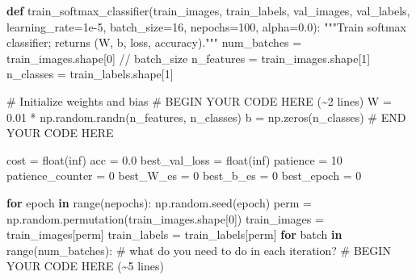 \documentclass[
  letterpaper,
  DIV=11,
  numbers=noendperiod]{scrartcl}
\newenvironment{Shaded}{\begin{snugshade}}{\end{snugshade}}
\newcommand{\BuiltInTok}[1]{\textcolor[rgb]{0.00,0.23,0.31}{#1}}
\newcommand{\CommentTok}[1]{\textcolor[rgb]{0.37,0.37,0.37}{#1}}
\newcommand{\ControlFlowTok}[1]{\textcolor[rgb]{0.00,0.23,0.31}{\textbf{#1}}}
\newcommand{\DecValTok}[1]{\textcolor[rgb]{0.68,0.00,0.00}{#1}}
\newcommand{\FloatTok}[1]{\textcolor[rgb]{0.68,0.00,0.00}{#1}}
\newcommand{\KeywordTok}[1]{\textcolor[rgb]{0.00,0.23,0.31}{\textbf{#1}}}
\newcommand{\NormalTok}[1]{\textcolor[rgb]{0.00,0.23,0.31}{#1}}
\newcommand{\OperatorTok}[1]{\textcolor[rgb]{0.37,0.37,0.37}{#1}}
\newcommand{\RegionMarkerTok}[1]{\textcolor[rgb]{0.00,0.23,0.31}{#1}}
\newcommand{\StringTok}[1]{\textcolor[rgb]{0.13,0.47,0.30}{#1}}
\begin{document}
\begin{Shaded}
\begin{Highlighting}[]
\KeywordTok{def}\NormalTok{ train\_softmax\_classifier(train\_images, train\_labels, val\_images, val\_labels,}
\NormalTok{                             learning\_rate}\OperatorTok{=}\FloatTok{1e{-}5}\NormalTok{, batch\_size}\OperatorTok{=}\DecValTok{16}\NormalTok{, nepochs}\OperatorTok{=}\DecValTok{100}\NormalTok{, alpha}\OperatorTok{=}\FloatTok{0.0}\NormalTok{):}
    \CommentTok{"""Train softmax classifier; returns (W, b, loss, accuracy)."""}
\NormalTok{    num\_batches }\OperatorTok{=}\NormalTok{ train\_images.shape[}\DecValTok{0}\NormalTok{] }\OperatorTok{//}\NormalTok{ batch\_size}
\NormalTok{    n\_features }\OperatorTok{=}\NormalTok{ train\_images.shape[}\DecValTok{1}\NormalTok{]}
\NormalTok{    n\_classes }\OperatorTok{=}\NormalTok{ train\_labels.shape[}\DecValTok{1}\NormalTok{]}

    \CommentTok{\# Initialize weights and bias}
    \CommentTok{\# }\RegionMarkerTok{BEGIN}\CommentTok{ YOUR CODE HERE (\textasciitilde{}2 lines)}
\NormalTok{    W }\OperatorTok{=} \FloatTok{0.01} \OperatorTok{*}\NormalTok{ np.random.randn(n\_features, n\_classes)}
\NormalTok{    b }\OperatorTok{=}\NormalTok{ np.zeros(n\_classes)}
    \CommentTok{\# }\RegionMarkerTok{END}\CommentTok{ YOUR CODE HERE}

\NormalTok{    cost }\OperatorTok{=} \BuiltInTok{float}\NormalTok{(}\StringTok{\textquotesingle{}inf\textquotesingle{}}\NormalTok{)}
\NormalTok{    acc }\OperatorTok{=} \FloatTok{0.0}
\NormalTok{    best\_val\_loss }\OperatorTok{=} \BuiltInTok{float}\NormalTok{(}\StringTok{\textquotesingle{}inf\textquotesingle{}}\NormalTok{)}
\NormalTok{    patience }\OperatorTok{=} \DecValTok{10}
\NormalTok{    patience\_counter }\OperatorTok{=} \DecValTok{0}
\NormalTok{    best\_W\_es }\OperatorTok{=} \DecValTok{0}
\NormalTok{    best\_b\_es }\OperatorTok{=} \DecValTok{0}
\NormalTok{    best\_epoch }\OperatorTok{=} \DecValTok{0} 

    \ControlFlowTok{for}\NormalTok{ epoch }\KeywordTok{in} \BuiltInTok{range}\NormalTok{(nepochs):}
\NormalTok{        np.random.seed(epoch)}
\NormalTok{        perm }\OperatorTok{=}\NormalTok{ np.random.permutation(train\_images.shape[}\DecValTok{0}\NormalTok{])}
\NormalTok{        train\_images }\OperatorTok{=}\NormalTok{ train\_images[perm]}
\NormalTok{        train\_labels }\OperatorTok{=}\NormalTok{ train\_labels[perm]}
        \ControlFlowTok{for}\NormalTok{ batch }\KeywordTok{in} \BuiltInTok{range}\NormalTok{(num\_batches):}
            \CommentTok{\# what do you need to do in each iteration?}
            \CommentTok{\# }\RegionMarkerTok{BEGIN}\CommentTok{ YOUR CODE HERE (\textasciitilde{}5 lines)}


\end{Highlighting}
\end{Shaded}
\end{document}
